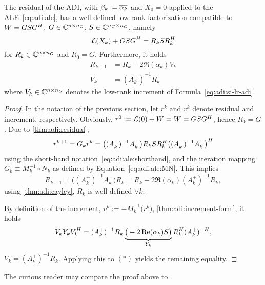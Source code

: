 \begin{theorem}
\label{thm:adi:lowrank-residual}
  The residual of the \ac{ADI},
  with $\beta_k := \conj{\alpha_k}$ and $X_0=0$ applied to the \ac{ALE}~\eqref{eq:adi:ale},
  has a well-defined low-rank factorization compatible to $W = GSG^H$,
  $G\in\mathbb{C}^{n\times n_G}$, $S\in\mathbb{C}^{n_G\times n_G}$, namely
  \begin{equation*}
    \operatorname{\mathcal L}(X_k) + G S G^H = R_k S R_k^H
  \end{equation*}
  for $R_k \in\mathbb{C}^{n\times n_G}$ and $R_0 = G$.
  Furthermore, it holds
  \begin{align*}
    R_{k+1} &= R_k - 2\Re(\alpha_k) V_k \\
    V_k &= (A_k^+)^{-1} R_k
  \end{align*}
  where $V_k \in\mathbb{C}^{n\times n_G}$ denotes the low-rank increment of Formula~\eqref{eq:adi:si-lr-adi}.
\end{theorem}
\begin{proof}
  In the notation of the previous section,
  let $r^k$ and $v^k$ denote residual and increment, respectively.
  Obviously, $r^0 := \operatorname{\mathcal L}(0) + W = W = GSG^H$, hence $R_0 = G$.
  Due to \autoref{thm:adi:residual},
  \begin{equation*}
    r^{k+1}
    = G_k r^k
    = \big( (A_k^+)^{-1} A_k^- \big)
    R_k S R_k^H
    \big( (A_k^+)^{-1} A_k^- \big)^H
  \end{equation*}
  using the short-hand notation~\eqref{eq:adi:ale:shorthand},
  and the iteration mapping $G_k \equiv M_k^{-1} \circ N_k$ as defined by Equation~\eqref{eq:adi:ale:MN}.
  This implies
  \begin{equation*}
  \tag{$\ast$}
    R_{k+1}
    = \big( (A_k^+)^{-1} A_k^- \big) R_k
    = R_k - 2\Re(\alpha_k) (A_k^+)^{-1} R_k
    ,
  \end{equation*}
  using \autoref{thm:adi:cayley},
  \ie $R_k$ is well-defined $\forall k$.

  By definition of the increment,
  $v^k := -M_k^{-1} \big( r^k \big)$,
  \cf \autoref{thm:adi:increment-form},
  it holds
  \begin{equation*}
    V_k Y_k V_k^H
    = (A_k^+)^{-1} R_k
    \underbrace{
      \big( -2 \operatorname{Re}(\alpha_k) S \big)
    }_{Y_k}
    R_k^H (A_k^+)^{-H}
    ,
  \end{equation*}
  \ie $V_k = (A_k^+)^{-1} R_k$.
  Applying this to $(\ast)$ yields the remaining equality.
\end{proof}

\begin{remark}
  The curious reader may compare the proof above to \cite[Theorem~3.5]{Kuerschner2016}.
\end{remark}

